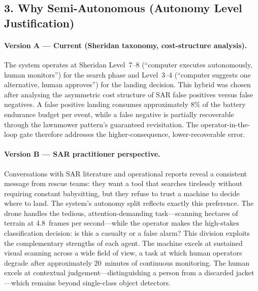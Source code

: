 \subsection*{3. Why Semi-Autonomous (Autonomy Level Justification)}

\paragraph{{\color{blue} Version A --- Current (Sheridan taxonomy, cost-structure analysis).}}
The system operates at Sheridan Level~7--8 (``computer executes autonomously, human monitors'') for the search phase and Level~3--4 (``computer suggests one alternative, human approves'') for the landing decision. This hybrid was chosen after analysing the asymmetric cost structure of SAR false positives versus false negatives. A false positive landing consumes approximately 8\% of the battery endurance budget per event, while a false negative is partially recoverable through the lawnmower pattern's guaranteed revisitation. The operator-in-the-loop gate therefore addresses the higher-consequence, lower-recoverable error.

\paragraph{{\color{red} Version B --- SAR practitioner perspective.}}
Conversations with SAR literature and operational reports reveal a consistent message from rescue teams: they want a tool that searches tirelessly without requiring constant babysitting, but they refuse to trust a machine to decide where to land. The system's autonomy split reflects exactly this preference. The drone handles the tedious, attention-demanding task---scanning hectares of terrain at 4.8~frames per second---while the operator makes the high-stakes classification decision: is this a casualty or a false alarm? This division exploits the complementary strengths of each agent. The machine excels at sustained visual scanning across a wide field of view, a task at which human operators degrade after approximately 20~minutes of continuous monitoring. The human excels at contextual judgement---distinguishing a person from a discarded jacket---which remains beyond single-class object detectors.

